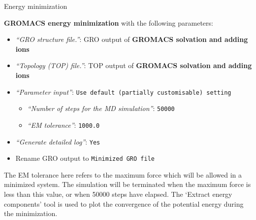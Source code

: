 \documentclass[twocolumn]{bmcart}%
\providecommand{\tightlist}{%
  \setlength{\itemsep}{0pt}\setlength{\parskip}{0pt}}
\begin{document}
\begin{handson_box_colour}{Energy minimization}


  \textbf{GROMACS energy minimization} with the following parameters:

  \begin{itemize}
  \tightlist
  \item
    \emph{``GRO structure file.''}: GRO output of
    \textbf{GROMACS solvation and adding ions}
  \item
    \emph{``Topology (TOP) file.''}: TOP output of
    \textbf{GROMACS solvation and adding ions}
  \item
    \emph{``Parameter input''}:
    \texttt{Use\ default\ (partially\ customisable)\ setting}

    \begin{itemize}
    \tightlist
    \item
      \emph{``Number of steps for the MD simulation''}: \texttt{50000}
    \item
      \emph{``EM tolerance''}: \texttt{1000.0}
    \end{itemize}
  \item
    \emph{``Generate detailed log''}: \texttt{Yes}
  \item
    Rename GRO output to \texttt{Minimized\ GRO\ file}
  \end{itemize}

\end{handson_box_colour}

The EM tolerance here refers to the maximum force which will be allowed in a minimized system. The simulation will be terminated when the maximum force is less than this value, or when 50000 steps have elapsed. The `Extract energy components' tool is used to plot the convergence of the potential energy during the minimization.
\end{document}
